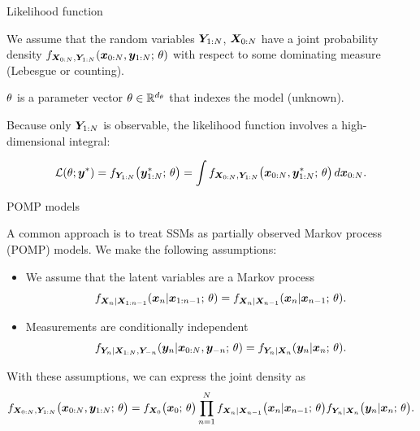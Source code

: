 \documentclass[aspectratio=169]{beamer}\usepackage[]{graphicx}\usepackage[]{xcolor}
\begin{document}
\begin{frame}{Likelihood function}

  We assume that the random variables $\bm{Y}_{{1}:{N}}$, $\bm{X}_{{0}:{N}}$ have a joint probability density $f_{\bm{X}_{{0}:{N}}, \bm{Y}_{{1}:{N}}}(\bm{x}_{{0}:{N}}, \bm{y}_{{1}:{N}}; \, \theta)$ with respect to some dominating measure (Lebesgue or counting).
  
  $\theta$ is a parameter vector $\theta \in \mathbb{R}^{d_\theta}$ that indexes the model (unknown).
  
  Because only $\bm{Y}_{{1}:{N}}$ is observable, the likelihood function involves a high-dimensional integral: 
  
\begin{eqnarray}
  \label{eq:likedef}
  \mathcal{L}(\theta; \bm{y}^*) = f_{\bm{Y}_{1:N}}\big(\bm{y}_{1:N}^*; \, \theta\big) = \int f_{\bm{X}_{{0}:{N}}, \bm{Y}_{{1}:{N}}}\big(\bm{x}_{{0}:{N}}, \bm{y}_{{1}:{N}}^*;\, \theta\big) \, d\bm{x}_{{0}:{N}}.
\end{eqnarray}

\end{frame}

\begin{frame}{POMP models}

A common approach is to treat SSMs as partially observed Markov process (POMP) models. We make the following assumptions: 
\begin{itemize}
  \item We assume that the latent variables are a Markov process
  $$
  f_{\bm{X}_{n} | \bm{X}_{1:n-1}}(\bm{x}_{n} | \bm{x}_{1:n-1}; \, \theta) = f_{\bm{X}_{n} | \bm{X}_{n-1}}(\bm{x}_{n} | \bm{x}_{n-1}; \, \theta).
  $$
  \item Measurements are conditionally independent
  $$
  f_{\bm{Y}_{n} | \bm{X}_{1:N}, \bm{Y}_{-n}}(\bm{y}_{n} | \bm{x}_{0:N}, \bm{y}_{-n}; \, \theta) = f_{\bm{Y}_{n} | \bm{X}_{n}}(\bm{y}_{n} | \bm{x}_{n}; \, \theta).
  $$
\end{itemize}
With these assumptions, we can express the joint density as
\begin{eqnarray}
\label{eq:jointLik}
f_{\bm{X}_{0:N}, \bm{Y}_{1:N}}\big(\bm{x}_{0:N}, \bm{y}_{1:N};\, \theta\big) = f_{\bm{X}_0}\big(\bm{x}_0;\, \theta\big)\prod_{n = 1}^N f_{\bm{X}_n|\bm{X}_{n-1}}\big(\bm{x}_{n}|\bm{x}_{n-1}; \, \theta\big)f_{\bm{Y}_n|\bm{X}_{n}}\big(\bm{y}_n|\bm{x}_{n}; \, \theta\big).
\end{eqnarray}
\end{frame}
\end{document}
